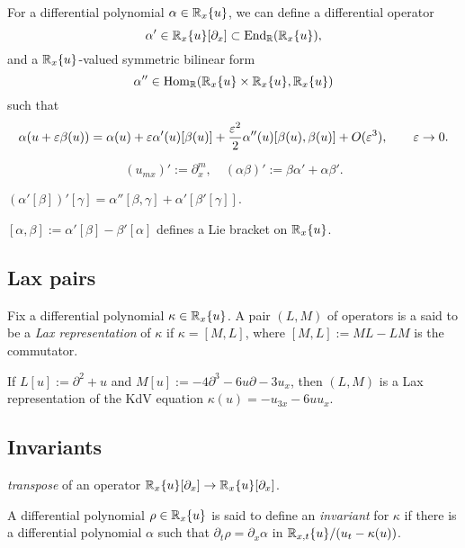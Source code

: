 \documentclass{../../../small}
\begin{document}
\begin{prb}
For a differential polynomial $\alpha\in\mathbb{R}_x\{u\}$, we can define a differential operator
\[\alpha'\in\mathbb{R}_x\{u\}[\partial_x]\subset\operatorname{End}_{\mathbb{R}}(\mathbb{R}_x\{u\}),\] and a $\mathbb{R}_x\{u\}$-valued symmetric bilinear form
\[\alpha''\in\operatorname{Hom}_{\mathbb{R}}(\mathbb{R}_x\{u\}\times\mathbb{R}_x\{u\},\mathbb{R}_x\{u\})\]
such that
\[\alpha(u+\varepsilon\beta(u))=\alpha(u)+\varepsilon\alpha'(u)[\beta(u)]+\frac{\varepsilon^2}2\alpha''(u)[\beta(u),\beta(u)]+O(\varepsilon^3),\qquad\varepsilon\to0.\]

\[(u_{mx})':=\partial_x^m,\quad(\alpha\beta)':=\beta\alpha'+\alpha\beta'.\]
\begin{parts}
\item $(\alpha'[\beta])'[\gamma]=\alpha''[\beta,\gamma]+\alpha'[\beta'[\gamma]]$.
\item $[\alpha,\beta]:=\alpha'[\beta]-\beta'[\alpha]$ defines a Lie bracket on $\mathbb{R}_x\{u\}$.
\end{parts}
\end{prb}


\subsection*{Lax pairs}

\begin{prb}
Fix a differential polynomial $\kappa\in\mathbb{R}_x\{u\}$.
A pair $(L,M)$ of operators is a said to be a \emph{Lax representation} of $\kappa$ if $\kappa=[M,L]$, where $[M,L]:=ML-LM$ is the commutator.
\begin{parts}
\item If $L[u]:=\partial^2+u$ and $M[u]:=-4\partial^3-6u\partial-3u_x$, then $(L,M)$ is a Lax representation of the KdV equation $\kappa(u)=-u_{3x}-6uu_x$.
\end{parts}
\end{prb}


\begin{prb}

\end{prb}



\subsection*{Invariants}
\begin{prb}
\emph{transpose} of an operator $\mathbb{R}_x\{u\}[\partial_x]\to\mathbb{R}_x\{u\}[\partial_x]$.
\end{prb}

\begin{prb}[Invariants]
A differential polynomial $\rho\in\mathbb{R}_x\{u\}$ is said to define an \emph{invariant} for $\kappa$ if there is a differential polynomial $\alpha$ such that $\partial_t\rho=\partial_x\alpha$ in $\mathbb{R}_{x,t}\{u\}/(u_t-\kappa(u))$.
\end{prb}
\end{document}
